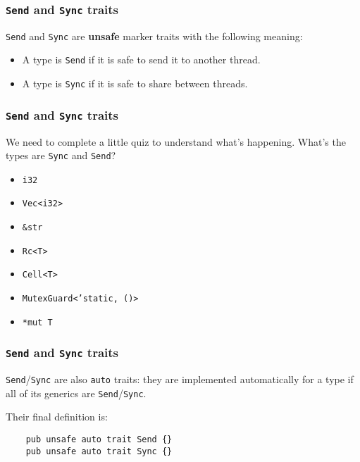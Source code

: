 \documentclass[aspectratio=1610,t]{beamer}
\begin{document}
\begin{frame}[fragile]
\frametitle{\texttt{Send} and \texttt{Sync} traits}
\texttt{Send} and \texttt{Sync} are \textbf{unsafe} marker traits with the following meaning:

\begin{itemize}
    \item A type is \texttt{Send} if it is safe to send it to another thread.
    \item A type is \texttt{Sync} if it is safe to share between threads. 
\end{itemize}
\end{frame}


\begin{frame}[fragile]
\frametitle{\texttt{Send} and \texttt{Sync} traits}
We need to complete a little quiz to understand what's happening. What's the types are \texttt{Sync} and \texttt{Send}?

\begin{itemize}
    \item \texttt{i32} 
    \item \texttt{Vec<i32>} 
    \item \texttt{\&str} 
    \item \texttt{Rc<T>} 
    \item \texttt{Cell<T>} 
    \item \texttt{MutexGuard<'static, ()>} 
    \item \texttt{*mut T} 
\end{itemize}

\end{frame}


\begin{frame}[fragile]
\frametitle{\texttt{Send} and \texttt{Sync} traits}
\texttt{Send}/\texttt{Sync} are also \texttt{auto} traits: they are implemented automatically for a type if all of its generics are \texttt{Send}/\texttt{Sync}.

Their final definition is:

\begin{verbatim}
    pub unsafe auto trait Send {}
    pub unsafe auto trait Sync {}
\end{verbatim}
\end{frame}
\end{document}
